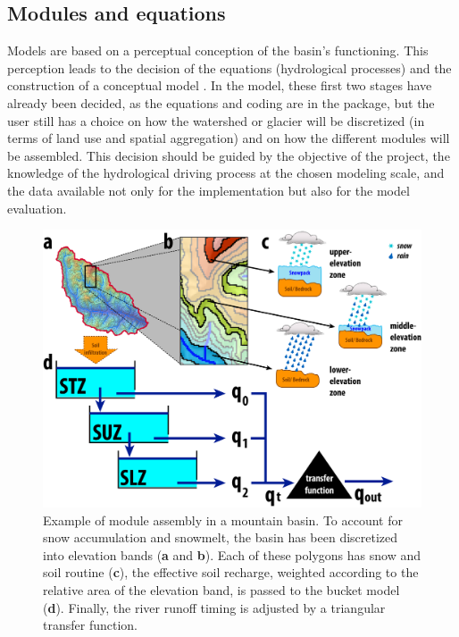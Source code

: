 \subsection{Modules and equations}

Models are based on a perceptual conception of the basin's functioning. This perception leads to the decision of the equations 
(hydrological processes) and the construction of a conceptual model \citep{beven:2012}. In the  model, these first
two stages have already been decided, as the equations and coding are in the package, but the user still has a choice on how the
watershed or glacier will be discretized (in terms of land use and spatial aggregation) and on how the different modules will be
assembled. This decision should be guided by the objective of the project, the knowledge of the hydrological driving
process at the chosen modeling scale, and the data available not only for the implementation but also for the model
evaluation.


\begin{figure}[htbp]
  \centering
  \includegraphics[scale = 0.6]{basin_hbv_2}
  \caption{Example of  module assembly in a mountain basin. To account for snow accumulation and snowmelt, the
  basin has been discretized into elevation bands (\textbf{a} and \textbf{b}). Each of these polygons has snow and soil routine
  (\textbf{c}), the effective soil recharge, weighted according to the relative area of the elevation band, is passed to the bucket
  model (\textbf{d}). Finally, the river runoff timing is adjusted by a triangular transfer function.}
  \label{figure:basin_hbv}
\end{figure}


